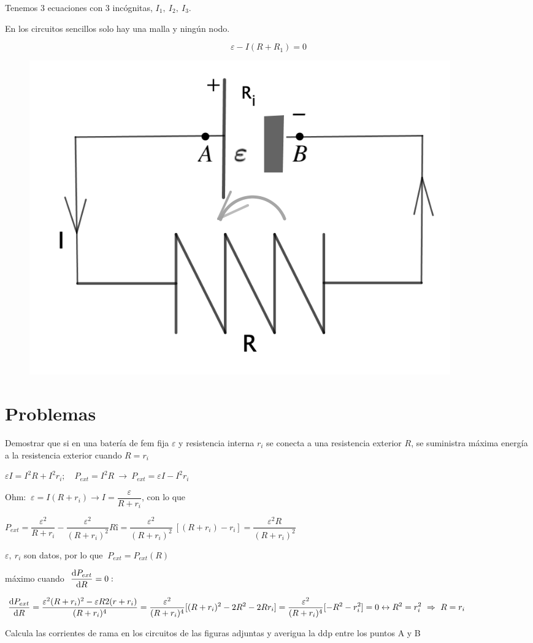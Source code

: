  Tenemos 3 ecuaciones con 3 incógnitas, $I_1,\ I_2,\ I_3$.
 

 
 \begin{multicols}{2}
En los circuitos sencillos solo hay una malla y ningún nodo.

 $$\varepsilon - I(R+R_1)=0$$
	\begin{figure}[H]
	\centering
	\includegraphics[width=.35\textwidth]{imagenes/imagenes25/T25IM09.png}
\end{figure}
\end{multicols}
 
 \section{Problemas}

\begin{prob}
Demostrar que si en una batería de fem fija $\varepsilon$ y resistencia interna $r_i$ se conecta a una resistencia exterior $R$, se suministra máxima energía a la resistencia exterior cuando $R=r_i$	
\end{prob}

$\varepsilon I=I^2R+I^2r_i;\quad P_{ext}=I^2R \ \to \ P_{ext}=\varepsilon I-I^2 r_i$

Ohm: $\ \varepsilon =I(R+r_i) \to I=\dfrac{\varepsilon}{R+r_i}$, con lo que

$P_{ext}=\dfrac{\varepsilon^2}{R+r_i}-\dfrac{\varepsilon^2}{(R+r_i)^2}Rî=\dfrac{\varepsilon^2}{(R+r_i)^2} \ [(R+r_i)-r_i]=\dfrac{\varepsilon^2 R}{(R+r_i)^2}$

$\varepsilon,\ r_i$ son datos, por lo que $\ P_{ext}=P_{ext}(R)$

máximo cuando $\ \displaystyle \dv{P_{ext}}{R}=0:$

$\displaystyle \dv{P_{ext}}{R}=\dfrac{\varepsilon^2(R+r_i)^2-\varepsilon R 2(r+r_i)}{(R+r_i)^4}=\dfrac{\varepsilon^2}{(R+r_i)^4} [ (R+r_i)^2-2R^2-2Rr_i ]=\dfrac{\varepsilon^2}{(R+r_i)^4} [-R^2-r_i^2]=0 \leftrightarrow R^2= r_i^2 \ \Rightarrow \ R=r_i$


\begin{prob}
Calcula las corrientes de rama en los circuitos de las figuras adjuntas y averigua la ddp entre los puntos A y B	
\end{prob}

